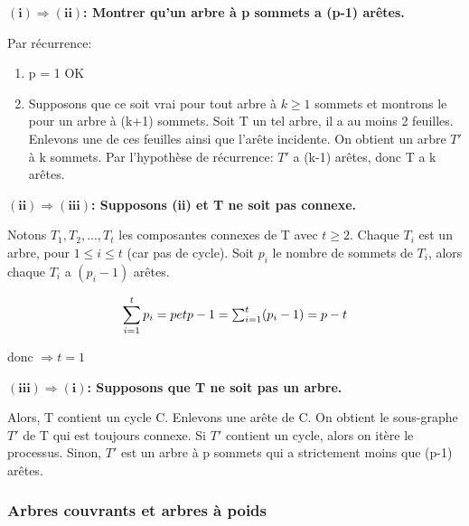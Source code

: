 \begin{demo}

$\mathbf{(i) \Rightarrow (ii)}$\textbf{: Montrer qu'un arbre à p sommets a (p-1) arêtes.}

	Par récurrence:
		\begin{enumerate}
			\item p = 1 OK 
			\item Supposons que ce soit vrai pour tout arbre à $ k \geq 1$ sommets et montrons le pour un arbre à (k+1) sommets. Soit T un tel arbre, il a au moins 2 feuilles. Enlevons une de ces feuilles ainsi que l'arête incidente. On obtient un arbre ${T}'$ à k sommets. Par l’hypothèse de récurrence: ${T}'$ a (k-1) arêtes, donc T a k arêtes.
		\end{enumerate} 

\hspace{-0.5cm}$\mathbf{(ii) \Rightarrow (iii)}$\textbf{: Supposons (ii) et T ne soit pas connexe.}

	Notons $T_{1}, T_{2},...,T_{t}$ les composantes connexes de T avec $t \geq 2$. Chaque $T_{i}$ est un arbre, pour $1 \leq i \leq t$ (car pas de cycle). Soit $p_{i}$ le nombre de sommets de $T_{i}$, alors chaque $T_{i}$ a $(p_{i}-1)$ arêtes.\\

	\begin{minipage}{.5\textwidth}
		\[\sum_{i=1}^{t} p_{i} = p$$ et $$p-1 = \sum_{i=1}^{t} (p_{i}-1) = p - t \]
	\end{minipage}
	\begin{minipage}{.5\textwidth}
		donc $\Rightarrow t = 1 $
	\end{minipage}

\hspace{-0.5cm}$\mathbf{(iii) \Rightarrow (i)}$\textbf{: Supposons que T ne soit pas un arbre.}

	Alors, T contient un cycle C. Enlevons une arête de C. On obtient le sous-graphe ${T}'$ de T qui est toujours connexe. Si ${T}'$ contient un cycle, alors on itère le processus. Sinon, ${T}'$ est un arbre à p sommets qui a strictement moins que (p-1) arêtes.
		
\end{demo}


\subsubsection{Arbres couvrants et arbres à poids}

